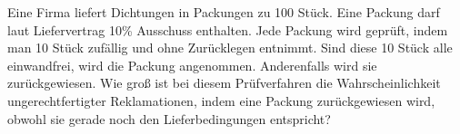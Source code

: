 \documentclass{abgabe}
\begin{document}
\begin{questions}
    \question
    Eine Firma liefert Dichtungen in Packungen zu 100 Stück. 
    Eine Packung darf laut Liefervertrag 10\% Ausschuss enthalten. 
    Jede Packung wird geprüft, indem man 10 Stück zufällig und ohne Zurücklegen entnimmt. 
    Sind diese 10 Stück alle einwandfrei, wird die Packung angenommen. 
    Anderenfalls wird sie zurückgewiesen.
    Wie groß ist bei diesem Prüfverfahren die Wahrscheinlichkeit ungerechtfertigter Reklamationen, indem eine Packung zurückgewiesen wird, obwohl sie gerade noch den Lieferbedingungen entspricht?
    \begin{solution}

    \end{solution}
\end{questions}
\end{document}

